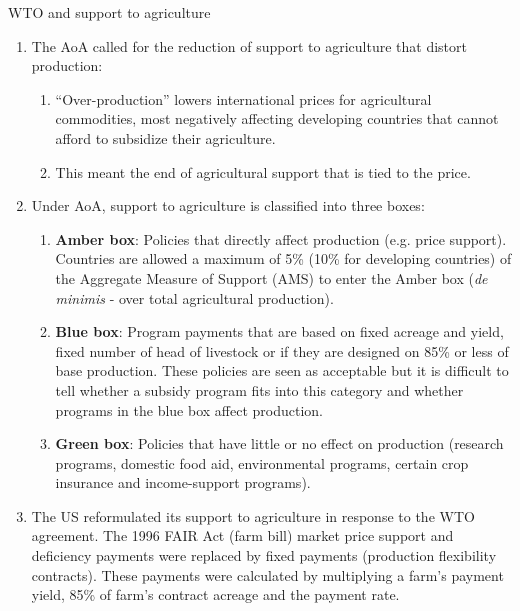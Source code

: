 \documentclass[table,xcolor=pdftex,dvipsnames]{beamer}\usepackage[]{graphicx}\usepackage[]{color}
\begin{document}
\begin{frame}[allowframebreaks]{WTO and support to agriculture}
\begin{enumerate}[label=\textbullet]
    \item The AoA called for the reduction of support to agriculture that distort production:
      \begin{enumerate}[label=-]
        \item ``Over-production'' lowers international prices for agricultural commodities, most negatively affecting developing countries that cannot afford to subsidize their agriculture.
        \item This meant the end of agricultural support that is tied to the price.
      \end{enumerate}
  \framebreak
   \item Under AoA, support to agriculture is classified into three boxes:
      \begin{enumerate}[label=\Roman*)]
        \item \textbf{Amber box}: Policies that directly affect production (e.g. price support). Countries are allowed a maximum of 5\% (10\% for developing countries) of the Aggregate Measure of Support (AMS) to enter the Amber box (\emph{de minimis} - over total agricultural production).
        \item \textbf{Blue box}: Program payments that are based on fixed acreage and yield, fixed number of head of livestock or if they are designed on 85\% or less of base production. These policies are seen as acceptable but it is difficult to tell whether a subsidy program fits into this category and whether programs in the blue box affect production.
        \item \textbf{Green box}: Policies that have little or no effect on production (research programs, domestic food aid, environmental programs, certain crop insurance and income-support programs).
      \end{enumerate}
   \item The US reformulated its support to agriculture in response to the WTO agreement. The 1996 FAIR Act (farm bill) market price support and deficiency payments were replaced by fixed payments (production flexibility contracts). These payments were calculated by multiplying a farm's payment yield, 85\% of farm's contract acreage and the payment rate.
\end{enumerate}
\end{frame}

\end{document}
